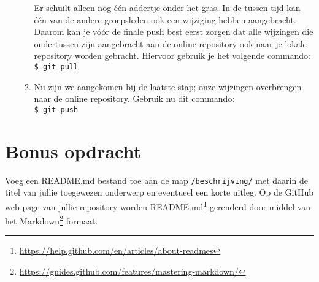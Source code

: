 \documentclass[a4paper]{article}
\begin{document}
\begin{enumerate}
\begin{enumerate}
            Er schuilt alleen nog \'e\'en addertje onder het gras.
            In de tussen tijd kan \'e\'en van de andere groepsleden ook een wijziging hebben aangebracht.
            Daarom kan je v\'o\'or de finale push best eerst zorgen dat alle wijzingen die ondertussen zijn aangebracht aan de online repository ook naar je lokale repository worden gebracht.
            Hiervoor gebruik je het volgende commando: \\
            \texttt{\$ git pull}
        \item Nu zijn we aangekomen bij de laatste stap; onze wijzingen overbrengen naar de online repository.
            Gebruik nu dit commando: \\
            \texttt{\$ git push}
    \end{enumerate}
\end{enumerate}


\section{Bonus opdracht}

Voeg een README.md bestand toe aan de map \texttt{/beschrijving/} met daarin de titel van jullie toegewezen onderwerp en eventueel een korte uitleg.
Op de GitHub web page van jullie repository worden README.md\footnote{\url{https://help.github.com/en/articles/about-readmes}} gerenderd door middel van het Markdown\footnote{\url{https://guides.github.com/features/mastering-markdown/}} formaat.



\end{document}
